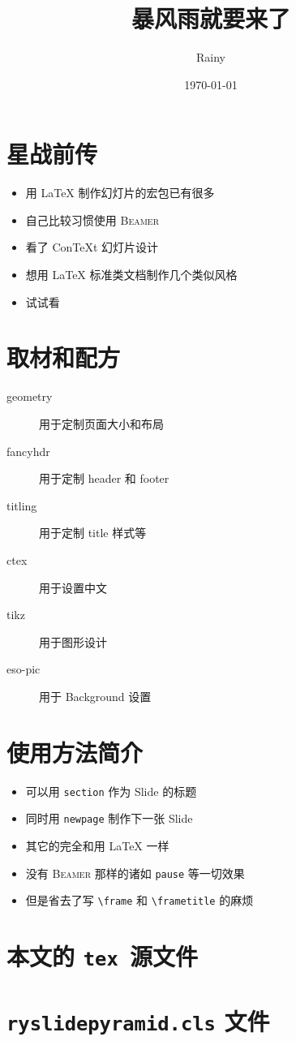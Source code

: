 \documentclass{ryslidepyramid}
\title{暴风雨就要来了}
\author{Rainy}
\date{\today}
\begin{document}
\myfrontcover
\tableofcontents\thispagestyle{empty}
\newpage\section{星战前传}
\begin{itemize}
    \item 用 \LaTeX{} 制作幻灯片的宏包已有很多
    \item 自己比较习惯使用 \textsc{Beamer}
    \item 看了 ConTeXt 幻灯片设计
    \item 想用 \LaTeX{} 标准类文档制作几个类似风格
    \item 试试看
\end{itemize}
\newpage\section{取材和配方}
\begin{description}
    \item[geometry] 用于定制页面大小和布局
    \item[fancyhdr] 用于定制 header 和 footer
    \item[titling] 用于定制 title 样式等
    \item[ctex] 用于设置中文
    \item[tikz] 用于图形设计
    \item[eso-pic] 用于 {\sc Background} 设置
\end{description}
\newpage\section{使用方法简介}
\begin{itemize}
    \item 可以用{ \tt section} 作为 Slide 的标题
    \item 同时用{ \tt newpage} 制作下一张 Slide
    \item 其它的完全和用 \LaTeX{} 一样
    \item 没有{ \textsc{Beamer}} 那样的诸如{ \tt pause} 等一切效果
    \item 但是省去了写{ \verb"\frame"} 和{ \verb"\frametitle"} 的麻烦
\end{itemize}
\newpage\section{本文的{ \tt tex }源文件}
\newpage\section{{\tt ryslidepyramid.cls} 文件}
\end{document}
